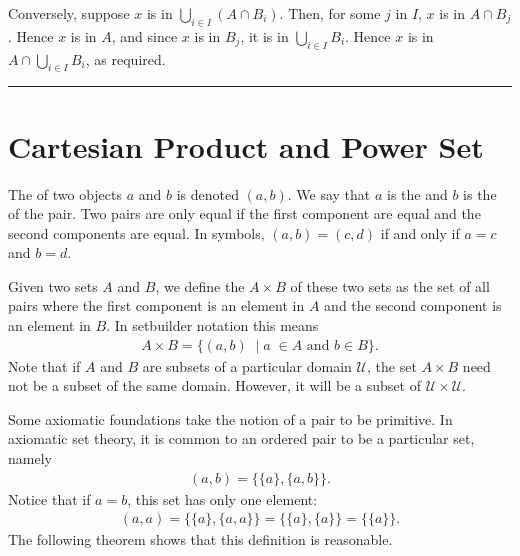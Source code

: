 \documentclass[letterpaper,10pt,english]{sphinxmanual}
\begin{document}
\sphinxAtStartPar
Conversely, suppose \(x\) is in \(\bigcup_{i \in I} (A \cap B_i)\). Then, for some \(j\) in \(I\), \(x\) is in \(A \cap B_j\). Hence \(x\) is in \(A\), and since \(x\) is in \(B_j\), it is in \(\bigcup_{i \in I} B_i\). Hence \(x\) is in \(A \cap \bigcup_{i \in I} B_i\), as required.


\bigskip\hrule\bigskip



\section{Cartesian Product and Power Set}
\label{\detokenize{sets:cartesian-product-and-power-set}}\label{\detokenize{sets:id3}}
\sphinxAtStartPar
The  of two objects \(a\) and \(b\) is denoted \((a, b)\). We say that \(a\) is the  and \(b\) is the  of the pair. Two pairs are only equal if the first component are equal and the second components are equal. In symbols, \((a, b) = (c, d)\) if and only if \(a = c\) and \(b = d\).

\sphinxAtStartPar
Given two sets \(A\) and \(B\), we define the  \(A \times B\) of these two sets as the set of all pairs where the first component is an element in \(A\) and the second component is an element in \(B\). In set\sphinxhyphen{}builder notation this means
\begin{equation*}
\begin{split}A \times B = \{(a, b) \; \mid a \; \in A \text{ and } b \in B\}.\end{split}
\end{equation*}
\sphinxAtStartPar
Note that if \(A\) and \(B\) are subsets of a particular domain \(\mathcal U\), the set \(A \times B\) need not be a subset of the same domain. However, it will be a subset of \(\mathcal U \times \mathcal U\).

\sphinxAtStartPar
Some axiomatic foundations take the notion of a pair to be primitive. In axiomatic set theory, it is common to  an ordered pair to be a particular set, namely
\begin{equation*}
\begin{split}(a, b) = \{\{a\}, \{a, b\}\}.\end{split}
\end{equation*}
\sphinxAtStartPar
Notice that if \(a = b\), this set has only one element:
\begin{equation*}
\begin{split}(a, a) = \{\{a\},\{a, a\}\} = \{\{a\},\{a\}\} = \{\{a\}\}.\end{split}
\end{equation*}
\sphinxAtStartPar
The following theorem shows that this definition is reasonable.
\end{document}

